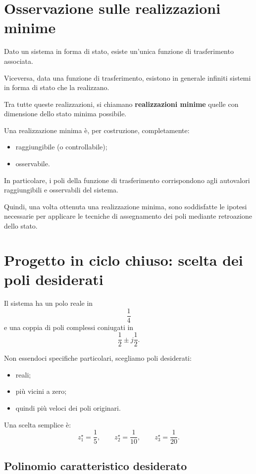 \section{Osservazione sulle realizzazioni minime}

Dato un sistema in forma di stato, esiste un'unica funzione di trasferimento associata.

Viceversa, data una funzione di trasferimento, esistono in generale infiniti sistemi in forma di stato che la realizzano.

Tra tutte queste realizzazioni, si chiamano \textbf{realizzazioni minime} quelle con dimensione dello stato minima possibile.

Una realizzazione minima è, per costruzione, completamente:
\begin{itemize}
    \item raggiungibile (o controllabile);
    \item osservabile.
\end{itemize}

In particolare, i poli della funzione di trasferimento corrispondono agli autovalori raggiungibili e osservabili del sistema.

Quindi, una volta ottenuta una realizzazione minima, sono soddisfatte le ipotesi necessarie
per applicare le tecniche di assegnamento dei poli mediante retroazione dello stato.

\section{Progetto in ciclo chiuso: scelta dei poli desiderati}

Il sistema ha un polo reale in
\[
\frac14
\]
e una coppia di poli complessi coniugati in
\[
\frac12\pm j\frac12.
\]

Non essendoci specifiche particolari, scegliamo poli desiderati:
\begin{itemize}
    \item reali;
    \item più vicini a zero;
    \item quindi più veloci dei poli originari.
\end{itemize}

Una scelta semplice è:
\[
z_1^\star=\frac15,
\qquad
z_2^\star=\frac1{10},
\qquad
z_3^\star=\frac1{20}.
\]

\subsection{Polinomio caratteristico desiderato}

